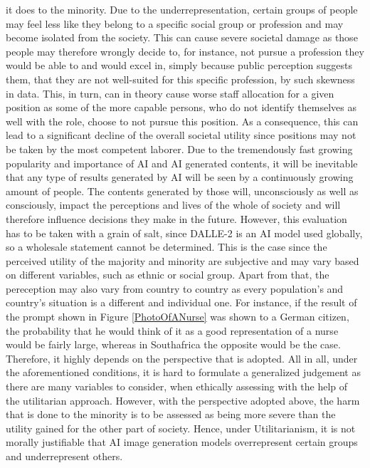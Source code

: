 \documentclass[10pt,twocolumn,twoside]{osajnl}
\begin{document}
it does to the minority. Due to the underrepresentation, certain groups of people may feel less like they belong to a specific social group or profession and may become isolated from the society. This can cause
severe societal damage as those people may therefore wrongly decide to, for instance, not pursue a profession they would be able to and would excel in, simply because public perception suggests them,
that they are not well-suited for this specific profession, by such skewness in data. This, in turn, can in theory cause worse staff allocation for a given position as some of the more capable persons,
who do not identify themselves as well with the role, choose to not pursue this position. As a consequence, this can lead to a significant decline of the overall societal utility since positions 
may not be taken by the most competent laborer. Due to the tremendously fast growing popularity and importance of AI and AI generated contents, it will be inevitable that any type of results generated 
by AI will be seen by a continuously growing amount of people. The contents generated by those will, unconsciously as well as consciously, impact the perceptions and lives of the whole of society and will therefore
influence decisions they make in the future.  
However, this evaluation has to be taken with a grain of salt, since DALLE-2 is an AI model used globally, so a wholesale statement cannot be determined. This is the case 
since the perceived utility of the majority and minority are subjective and may vary based on different variables, such as ethnic or social group. Apart from that,
the pereception may also vary from country to country as every population's and country's situation is a different and individual one. 
For instance, if the result of the prompt shown in Figure \ref{PhotoOfANurse} was shown to a German citizen, the probability that he would think of it as a good representation of a nurse would be 
fairly large, whereas in Southafrica the opposite would be the case. Therefore, it highly depends on the perspective that is adopted.
All in all, under the aforementioned conditions, it is hard to formulate a generalized judgement as there are many variables to consider, when ethically assessing with the help of the utilitarian approach.
However, with the perspective adopted above, the harm that is done to the minority is to be assessed as being more severe than the utility gained for the other part of society. Hence, under Utilitarianism,
it is not morally justifiable that AI image generation models overrepresent certain groups and underrepresent others.  
\end{document}
